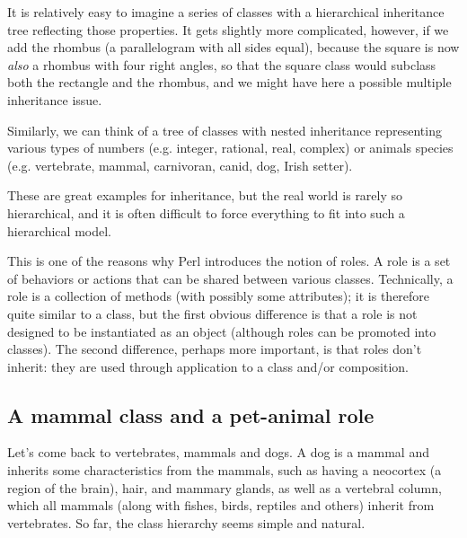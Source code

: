 It is relatively easy to imagine a series of classes with a 
hierarchical inheritance tree reflecting those properties. It 
gets slightly more complicated, however, if we add the rhombus 
(a parallelogram with all sides equal), because the square is 
now \emph{also} a rhombus with four right angles, so that 
the square class would subclass both the rectangle and the 
rhombus, and we might have here a possible multiple inheritance 
issue.

   
  
 
Similarly, we can think of a tree of classes with nested 
inheritance representing various types of numbers (e.g. integer, 
rational, real, complex) or animals species (e.g. vertebrate, 
mammal, carnivoran, canid, dog, Irish setter).

These are great examples for inheritance, but the real world is 
rarely so hierarchical, and it is often difficult to force 
everything to fit into such a hierarchical model.

This is one of the reasons why Perl introduces the notion of 
roles. A role is a set of behaviors or actions that can be shared 
between various classes. Technically, a role is a collection 
of methods (with possibly some attributes); it is therefore 
quite similar to a class, but the first obvious difference 
is that a role is not designed to be instantiated as an object 
(although roles can be promoted into classes). The 
second difference, perhaps more important, is that roles 
don't inherit: they are used through application to a class 
and/or composition.

\subsection{A mammal class and a pet-animal role}

  
Let's come back to vertebrates, mammals and dogs. A dog is 
a mammal and inherits some characteristics from the mammals, 
such as having a neocortex (a region of the brain), hair, 
and mammary glands, as well as a vertebral column, which 
all mammals (along with fishes, birds, reptiles and others) 
inherit from vertebrates. So far, the class hierarchy seems 
simple and natural.

